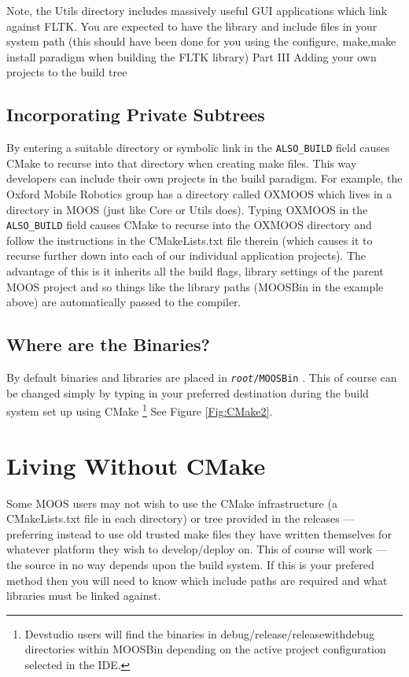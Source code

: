 \documentclass[a4paper,10pt]{article}
\newcommand{\Code}[1]{\texttt{#1} }
\newcommand{\code}[1]{\Code{#1} }
\begin{document}
Note, the Utils directory includes massively useful GUI
applications which link against FLTK. You are expected to have the
library and include files in your system path (this should have
been done for you using the configure, make,make install paradigm
when building the FLTK library) Part III Adding your own projects
to the build tree


\subsection{Incorporating Private Subtrees}\label{Sec:PrivatCode}

By entering a suitable directory or symbolic link in the
\code{ALSO\_BUILD} field causes CMake to recurse into that
directory when creating make files. This way developers can
include their own projects in the build paradigm. For example, the
Oxford Mobile Robotics group has a directory called OXMOOS which
lives in a directory in MOOS (just like Core or Utils does).
Typing OXMOOS in the \code{ALSO\_BUILD} field causes CMake to
recurse into the OXMOOS directory and follow the instructions in
the CMakeLists.txt file therein (which causes it to recurse
further down into each of our individual application projects).
The advantage of this is it inherits all the build flags, library
settings of the parent MOOS project and so things like the library
paths (MOOSBin in the example above) are automatically passed to
the compiler.\\ 

\subsection{Where are the Binaries?}
By default binaries and
libraries are placed in \code{\textit{root}/MOOSBin}. This of course can be
changed simply by typing in your preferred destination during the
build system set up using CMake \footnote{Devstudio users will
find the binaries in debug/release/releasewithdebug directories
within MOOSBin depending on the active project configuration
selected in the IDE.} See Figure \ref{Fig:CMake2}.


\section{Living Without CMake}\label{Sec:RollYourOwn}

Some MOOS users may not wish to use the CMake infrastructure  (a
CMakeLists.txt file in each directory) or tree provided in the
releases --- preferring instead to use old trusted make files they have
written themselves for whatever platform they wish to
develop/deploy on. This of course will work --- the source in no
way depends upon the build system. 
If this is your prefered method then you will need to know which
include paths are required and what libraries must be linked against.
\end{document}
